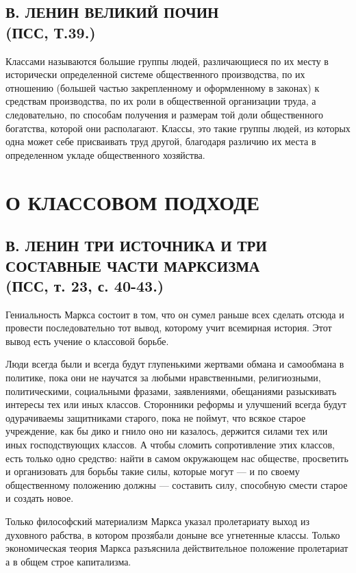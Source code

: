 \documentclass[12pt]{article}
\newcommand\resetparcount{%
  \setcounter{parcount}{0}
}
\newcommand{\parnum}{(\arabic{parcount})}
\newcounter{parcount}
\newenvironment{parnumbers}{%
  \par%
  \everypar{\noindent \stepcounter{parcount}\marginpar[]{\parnum}}%
}{}
\begin{document}
\subsection{В. ЛЕНИН ВЕЛИКИЙ ПОЧИН\\
    (ПСС, Т.39.)}
  \begin{parnumbers}
    Классами называются большие группы людей, различающиеся по их месту в исторически определенной системе общественного производства, по их отношению (большей частью закрепленному и оформленному в законах) к средствам производства, по их роли в общественной организации труда, а следовательно, по способам получения и размерам той доли общественного богатства, которой они располагают. Классы, это такие группы людей, из которых одна может себе присваивать труд другой, благодаря различию их места в определенном укладе общественного хозяйства.

  \end{parnumbers}



\section{О КЛАССОВОМ ПОДХОДЕ}
\subsection{В. ЛЕНИН ТРИ ИСТОЧНИКА И ТРИ СОСТАВНЫЕ ЧАСТИ МАРКСИЗМА\\
    (ПСС, т. 23, с. 40-43.)}
  \begin{parnumbers}
        Гениальность Маркса состоит в том, что он сумел раньше всех сделать отсюда и провести последовательно тот вывод, которому учит всемирная история. Этот вывод есть учение о классовой борьбе.

    Люди всегда были и всегда будут глупенькими жертвами обмана и самообмана в политике, пока они не научатся за любыми нравственными, религиозными, политическими, социальными фразами, заявлениями, обещаниями разыскивать интересы тех или иных классов. Сторонники реформы и улучшений всегда будут одурачиваемы защитниками старого, пока не поймут, что всякое старое учреждение, как бы дико и гнило оно ни казалось, держится силами тех или иных господствующих классов. А чтобы сломить сопротивление этих классов, есть только одно средство: найти в самом окружающем нас обществе, просветить и организовать для борьбы такие силы, которые могут — и по своему общественному положению должны — составить силу, способную смести старое и создать новое.

    Только философский материализм Маркса указал пролетариату выход из духовного рабства, в котором прозябали доныне все угнетенные классы. Только экономическая теория Маркса разъяснила действительное положение пролетариат а в общем строе капитализма.

  \end{parnumbers}
\end{document}
